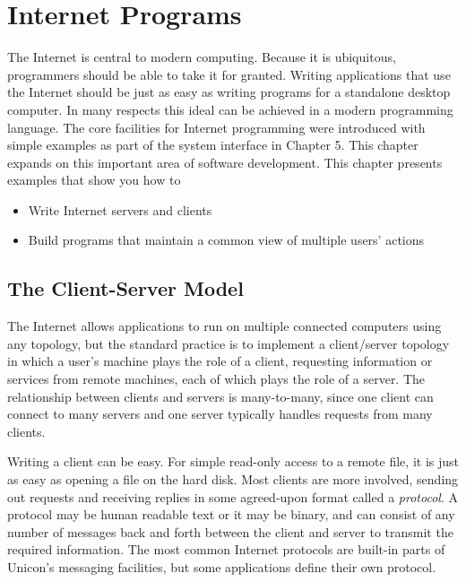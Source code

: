 \chapter{Internet Programs}

The Internet is central to modern computing. Because
it is ubiquitous, programmers should be able to take it for granted.
Writing applications that use the Internet should be just as easy
as writing programs for a standalone desktop computer. In many respects
this ideal can be achieved in a modern programming language. The core
facilities for Internet programming were introduced with simple
examples as part of the system interface in Chapter 5. This chapter
expands on this important area of software development. This chapter
presents examples that show you how to
\begin{itemize}\itemsep0pt
\item Write Internet servers and clients
\item Build programs that maintain a common view of multiple
users' actions
\end{itemize}

\section{The Client-Server Model}

The Internet allows applications to run on multiple connected
computers using any topology, but the standard practice is to implement a
client/server topology in which a
user's machine plays the role of a client, requesting
information or services from remote machines, each of which plays the
role of a server. The relationship between clients and servers is
many-to-many, since one client can connect to many servers and one
server typically handles requests from many clients.

Writing a client can be easy. For simple read-only
access to a remote file, it is just as easy as opening a file on the
hard disk. Most clients are more involved, sending out requests
and receiving replies in some agreed-upon format called a
\textit{protocol}. A protocol may be human readable
text or it may be binary, and can consist of any number of messages
back and forth between the client and server to transmit the required
information. The most common Internet protocols are built-in parts of
Unicon's messaging facilities, but some applications
define their own protocol.

